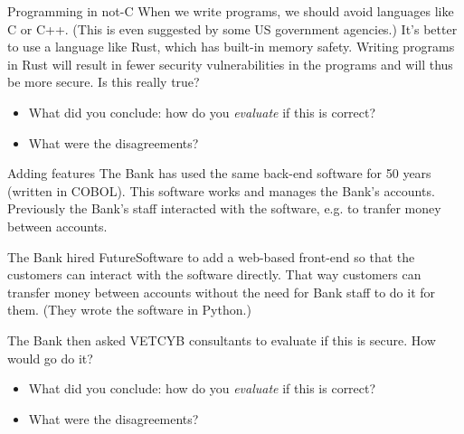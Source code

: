\begin{frame}
  \begin{block}{Programming in not-C}
    When we write programs, we should avoid languages like C or C++. (This is even 
    suggested by some US government agencies.) It's better to use a language like 
    Rust, which has built-in memory safety. Writing programs in Rust will result in 
    fewer security vulnerabilities in the programs and will thus be more secure. Is 
    this really true?
  \end{block}

  \begin{question}
    \begin{itemize}
      \item What did you conclude: how do you \emph{evaluate} if this is 
        correct?
      \item What were the disagreements?
    \end{itemize}
  \end{question}
\end{frame}

\begin{frame}
  \begin{block}{Adding features}
    The Bank has used the same back-end software for 50 years (written in COBOL). 
    This software works and manages the Bank's accounts. Previously the Bank's 
    staff interacted with the software, e.g. to tranfer money between accounts.

    The Bank hired FutureSoftware to add a web-based front-end so that the 
    customers can interact with the software directly. That way customers can 
    transfer money between accounts without the need for Bank staff to do it for 
    them. (They wrote the software in Python.)

    The Bank then asked VETCYB consultants to evaluate if this is secure. How would 
    go do it?
  \end{block}

  \begin{question}
    \begin{itemize}
      \item What did you conclude: how do you \emph{evaluate} if this is 
        correct?
      \item What were the disagreements?
    \end{itemize}
  \end{question}
\end{frame}

